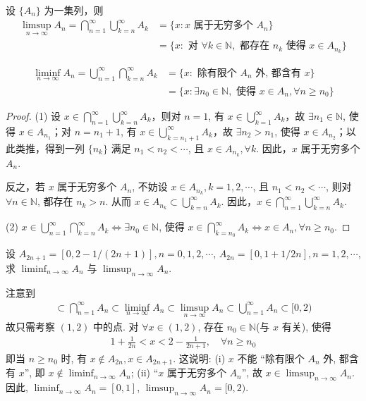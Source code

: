 \documentclass[../../main.tex]{subfiles}
\begin{document}
\begin{proposition}
设 $\{A_n\}$ 为一集列，则
\begin{align*}
\limsup_{n \to \infty} A_n = \bigcap_{n = 1}^{\infty} \bigcup_{k = n}^{\infty} A_k 
&= \{x: x \text{ 属于无穷多个 } A_n\}\\
&= \{x: \text{ 对 } \forall k \in \mathbb{N}, \text{ 都存在 } n_k \text{ 使得 } x \in A_{n_k}\}
\end{align*}

\begin{align*}
\liminf_{n \to \infty} A_n = \bigcup_{n = 1}^{\infty} \bigcap_{k = n}^{\infty} A_k 
&= \{x: \text{ 除有限个 } A_n \text{ 外, 都含有 } x\}\\
&= \{x: \exists n_0 \in \mathbb{N}, \text{ 使得 } x \in A_n, \forall n \geqslant n_0\}
\end{align*}
\end{proposition}
\begin{proof}
(1) 设 $x \in \bigcap_{n = 1}^{\infty} \bigcup_{k = n}^{\infty} A_k$，则对 $n = 1$, 有 $x \in \bigcup_{k = 1}^{\infty} A_k$，故 $\exists n_1 \in \mathbb{N}$, 使得 $x \in A_{n_1}$；对 $n = n_1 + 1$, 有 $x \in \bigcup_{k = n_1 + 1}^{\infty} A_k$，故 $\exists n_2 > n_1$, 使得 $x \in A_{n_2}$；以此类推，得到一列 $\{n_k\}$ 满足 $n_1 < n_2 < \cdots$, 且 $x \in A_{n_k}, \forall k$. 因此，$x$ 属于无穷多个 $A_n$.

反之，若 $x$ 属于无穷多个 $A_n$, 不妨设 $x \in A_{n_k}, k = 1, 2, \cdots$, 且 $n_1 < n_2 < \cdots$, 则对 $\forall n \in \mathbb{N}$, 都存在 $n_k > n$. 从而 $x \in A_{n_k} \subset \bigcup_{k = n}^{\infty} A_k$. 因此，$x \in \bigcap_{n = 1}^{\infty} \bigcup_{k = n}^{\infty} A_k$.

(2) $x \in \bigcup_{n = 1}^{\infty} \bigcap_{k = n}^{\infty} A_k \Longleftrightarrow \exists n_0 \in \mathbb{N}$, 使得 $x \in \bigcap_{k = n_0}^{\infty} A_k \Longleftrightarrow x \in A_n, \forall n \geqslant n_0$. 
\end{proof}

\begin{example}
设 $A_{2n + 1} = [0, 2 - 1/(2n + 1)], n = 0, 1, 2, \cdots$, $A_{2n} = [0, 1 + 1/2n], n = 1, 2, \cdots$, 求 $\liminf_{n \to \infty} A_n$ 与 $\limsup_{n \to \infty} A_n$.
\end{example}
\begin{solution}
注意到
\begin{align*}
[0, 1] \subset \bigcap_{n = 1}^{\infty} A_n \subset \liminf_{n \to \infty} A_n \subset \limsup_{n \to \infty} A_n \subset \bigcup_{n = 1}^{\infty} A_n \subset [0, 2)
\end{align*}
故只需考察 $(1, 2)$ 中的点. 对 $\forall x \in (1, 2)$, 存在 $n_0 \in \mathbb{N}$(与 $x$ 有关), 使得
\begin{align*}
1 + \frac{1}{2n} < x < 2 - \frac{1}{2n + 1}, \quad \forall n \geqslant n_0
\end{align*}
即当 $n \geqslant n_0$ 时, 有 $x \notin A_{2n}, x \in A_{2n + 1}$. 这说明: (i) $x$ 不能 “除有限个 $A_n$ 外, 都含有 $x$”, 即 $x \notin \liminf_{n \to \infty} A_n$; (ii) “$x$ 属于无穷多个 $A_n$”, 故 $x \in \limsup_{n \to \infty} A_n$. 因此, $\liminf_{n \to \infty} A_n = [0, 1]$, $\limsup_{n \to \infty} A_n = [0, 2)$.
\end{solution}
\end{document}
